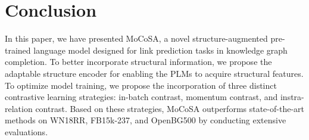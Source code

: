 \documentclass[11pt]{article}
\begin{document}
\begin{table*}[ht]
\centering
{}
\vspace{-5pt}
\caption{Ablation study on WN18RR, FB15k-237 and OpenBG500. "IB", "MH", "ASE" and "IR" refer to in-batch negatives, momentum hard negatives, adaptable structural encoder, and instra-relation negatives.}
\label{tab:ablation study}
\vspace{-10pt}
\end{table*}

\section{Conclusion}

In this paper, we have presented MoCoSA, a novel structure-augmented pre-trained language model designed for link prediction tasks in knowledge graph completion. To better incorporate structural information, we propose the adaptable structure encoder for enabling the PLMs to acquire structural features. To optimize model training, we propose the incorporation of three distinct contrastive learning strategies: in-batch contrast, momentum contrast, and instra-relation contrast. Based on these strategies, MoCoSA outperforms state-of-the-art methods on WN18RR, FB15k-237, and OpenBG500 by conducting extensive evaluations.
 


\clearpage


\end{document}

